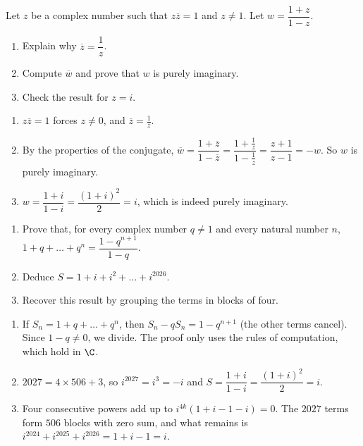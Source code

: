 \begin{exercise}
Let $z$ be a complex number such that $z\overline z=1$ and $z\neq1$. Let $w=\dfrac{1+z}{1-z}$.
\begin{enumerate}
\item Explain why $\overline z=\dfrac1z$.
\item Compute $\overline w$ and prove that $w$ is purely imaginary.
\item Check the result for $z=i$.
\end{enumerate}
\end{exercise}
\begin{solution}
\begin{enumerate}
\item $z\overline z=1$ forces $z\neq0$, and $\overline z=\frac1z$.
\item By the properties of the conjugate, $\overline w=\dfrac{1+\overline z}{1-\overline z}=\dfrac{1+\frac1z}{1-\frac1z}=\dfrac{z+1}{z-1}=-w$. So $w$ is purely imaginary.
\item $w=\dfrac{1+i}{1-i}=\dfrac{(1+i)^2}{2}=i$, which is indeed purely imaginary.
\end{enumerate}
\end{solution}

\begin{exercise}
\begin{enumerate}
\item Prove that, for every complex number $q\neq1$ and every natural number $n$, $1+q+\dots+q^n=\dfrac{1-q^{n+1}}{1-q}$.
\item Deduce $S=1+i+i^2+\dots+i^{2026}$.
\item Recover this result by grouping the terms in blocks of four.
\end{enumerate}
\end{exercise}
\begin{solution}
\begin{enumerate}
\item If $S_n=1+q+\dots+q^n$, then $S_n-qS_n=1-q^{n+1}$ (the other terms cancel). Since $1-q\neq0$, we divide. The proof only uses the rules of computation, which hold in $\C$.
\item $\num{2027}=4\times506+3$, so $i^{2027}=i^3=-i$ and $S=\dfrac{1+i}{1-i}=\dfrac{(1+i)^2}{2}=i$.
\item Four consecutive powers add up to $i^{4k}(1+i-1-i)=0$. The $\num{2027}$ terms form $506$ blocks with zero sum, and what remains is $i^{2024}+i^{2025}+i^{2026}=1+i-1=i$.
\end{enumerate}
\end{solution}

